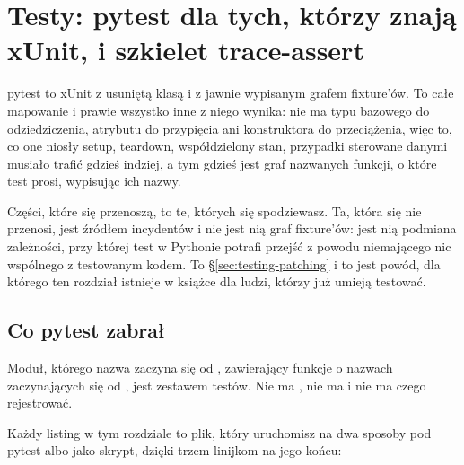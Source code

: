 
\chapter{Testy: pytest dla tych, którzy znają xUnit, i szkielet trace-assert}
\label{ch:testing}

\noindent
pytest to xUnit z usuniętą klasą i z jawnie wypisanym grafem fixture'ów. To
całe mapowanie i prawie wszystko inne z niego wynika: nie ma typu bazowego
do odziedziczenia, atrybutu do przypięcia ani konstruktora do przeciążenia,
więc to, co one niosły \dash{} setup, teardown, współdzielony stan,
przypadki sterowane danymi \dash{} musiało trafić gdzieś indziej, a tym
gdzieś jest graf nazwanych funkcji, o które test prosi, wypisując ich nazwy.

Części, które się przenoszą, to te, których się spodziewasz. Ta, która się
nie przenosi, jest źródłem incydentów i nie jest nią graf fixture'ów: jest
nią podmiana zależności, przy której test w Pythonie potrafi przejść z
powodu niemającego nic wspólnego z testowanym kodem. To
\S\ref{sec:testing-patching} i to jest powód, dla którego ten rozdział
istnieje w książce dla ludzi, którzy już umieją testować.

\section{Co pytest zabrał}
\label{sec:testing-discovery}

Moduł, którego nazwa zaczyna się od , zawierający funkcje o
nazwach zaczynających się od , jest zestawem testów. Nie ma
\code{[Fact]}, nie ma  i nie ma czego rejestrować.


\noindent
Każdy listing w tym rozdziale to plik, który uruchomisz na dwa sposoby
\dash{} pod pytest albo jako skrypt, dzięki trzem linijkom na jego końcu:

